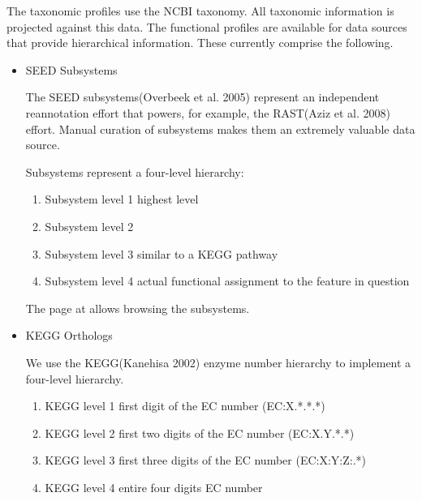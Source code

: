 \documentclass[letterpaper,10pt,english]{sphinxmanual}
\begin{document}
The taxonomic profiles use the NCBI taxonomy. All taxonomic information
is projected against this data. The functional profiles are available
for data sources that provide hierarchical information. These currently
comprise the following.
\begin{itemize}
\item {} 
SEED Subsystems

The SEED subsystems(Overbeek et al. 2005) represent an independent
reannotation effort that powers, for example, the RAST(Aziz et al.
2008) effort. Manual curation of subsystems makes them an extremely
valuable data source.

Subsystems represent a four-level hierarchy:
\begin{enumerate}
\def\theenumi{\arabic{enumi}}
\def\labelenumi{\theenumi .}
\makeatletter\def\p@enumii{\p@enumi \theenumi .}\makeatother
\item {} 
Subsystem level 1 \textendash{} highest level

\item {} 
Subsystem level 2 \textendash{}

\item {} 
Subsystem level 3 \textendash{} similar to a KEGG pathway

\item {} 
Subsystem level 4 \textendash{} actual functional assignment to the feature in
question

\end{enumerate}

The page at  allows
browsing the subsystems.

\item {} 
KEGG Orthologs

We use the KEGG(Kanehisa 2002) enzyme number hierarchy to implement a
four-level hierarchy.
\begin{enumerate}
\def\theenumi{\arabic{enumi}}
\def\labelenumi{\theenumi .}
\makeatletter\def\p@enumii{\p@enumi \theenumi .}\makeatother
\item {} 
KEGG level 1 \textendash{} first digit of the EC number (EC:X.*.*.*)

\item {} 
KEGG level 2 \textendash{} first two digits of the EC number (EC:X.Y.*.*)

\item {} 
KEGG level 3 \textendash{} first three digits of the EC number (EC:X:Y:Z:.*)

\item {} 
KEGG level 4 \textendash{} entire four digits EC number


\end{enumerate}
\end{itemize}
\end{document}
